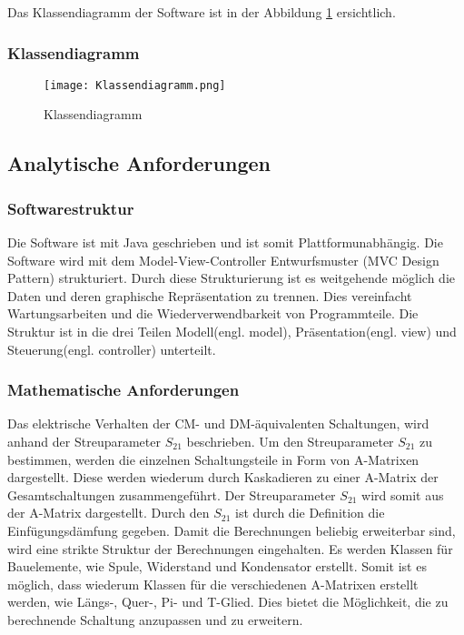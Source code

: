 Das Klassendiagramm der Software ist in der Abbildung \ref{fig:Klassendiagramm} ersichtlich.

\newpage

\subsubsection{Klassendiagramm} \label{subsubsec:Klassendiagramm}

\begin{figure}[H]
	\centering
	\texttt{[image: Klassendiagramm.png]}
	\caption{Klassendiagramm}
	\label{fig:Klassendiagramm}
\end{figure} 

\newpage

\subsection{Analytische Anforderungen} \label{subsubsec:analytischeanforderungen}

\bigskip
{}
\subsubsection{Softwarestruktur} \label{subsubsec:Softwarestruktur}
Die Software ist mit Java geschrieben und ist somit Plattformunabhängig. Die Software wird mit dem Model-View-Controller Entwurfsmuster (MVC Design Pattern) \cite{MVCDesignPattern} strukturiert. Durch diese Strukturierung ist es weitgehende möglich die Daten und deren graphische Repräsentation zu trennen. Dies vereinfacht Wartungsarbeiten und die Wiederverwendbarkeit von Programmteile. Die Struktur ist in die drei Teilen Modell(engl. model), Präsentation(engl. view) und Steuerung(engl. controller) unterteilt.

\bigskip
\subsubsection{Mathematische Anforderungen}\label{subsubsec:mathematischeanforderungen}
Das elektrische Verhalten der CM- und DM-äquivalenten Schaltungen, wird anhand der Streuparameter $S_{21}$ beschrieben. Um den Streuparameter $S_{21}$ zu bestimmen, werden die einzelnen Schaltungsteile in Form von A-Matrixen dargestellt. Diese werden wiederum durch Kaskadieren zu einer A-Matrix der Gesamtschaltungen  zusammengeführt. Der Streuparameter $S_{21}$ wird somit aus der A-Matrix dargestellt. Durch den $S_{21}$ ist durch die Definition die Einfügungsdämfung gegeben. Damit die Berechnungen beliebig erweiterbar sind, wird eine strikte Struktur der Berechnungen eingehalten. Es werden Klassen für Bauelemente, wie Spule, Widerstand und Kondensator erstellt. Somit ist es möglich, dass wiederum Klassen für die verschiedenen A-Matrixen erstellt werden, wie Längs-, Quer-, Pi- und T-Glied. Dies bietet die Möglichkeit, die zu berechnende Schaltung anzupassen und zu erweitern.
\bigskip
